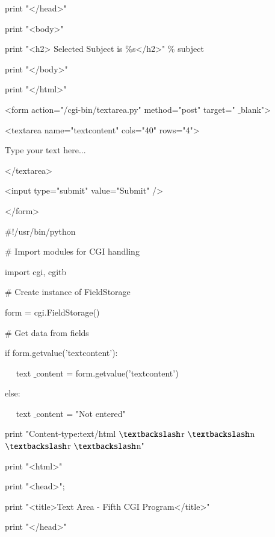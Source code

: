\documentclass[a4paper,12pt]{report}
\begin{document}
\noindent 
print "</head>" \par
\noindent 
print "<body>" \par
\noindent 
print "<h2> Selected Subject is  $  \%  $s</h2>"  $  \%  $ subject \par
\noindent 
print "</body>" \par
\noindent 
print "</html>" \par
\vspace{12pt}
\noindent 
<form action="/cgi-bin/textarea.py" method="post" target=" $  \_  $blank"> \par
\noindent 
<textarea name="textcontent" cols="40" rows="4"> \par
\noindent 
Type your text here... \par
\noindent 
</textarea> \par
\noindent 
<input type="submit" value="Submit" /> \par
\noindent 
</form> \par
\vspace{12pt}
\noindent 
 $  \#  $!/usr/bin/python \par
\vspace{12pt}
\noindent 
 $  \#  $ Import modules for CGI handling  \par
\noindent 
import cgi, cgitb  \par
\vspace{12pt}
\noindent 
 $  \#  $ Create instance of FieldStorage  \par
\noindent 
form = cgi.FieldStorage()  \par
\vspace{12pt}
\noindent 
 $  \#  $ Get data from fields \par
\noindent 
if form.getvalue('textcontent'): \par
\noindent 
~~ text $  \_  $content = form.getvalue('textcontent') \par
\noindent 
else: \par
\noindent 
~~ text $  \_  $content = "Not entered" \par
\vspace{12pt}
\noindent 
print "Content-type:text/html $  \textbackslash  $r $  \textbackslash  $n $  \textbackslash  $r $  \textbackslash  $n" \par
\noindent 
print "<html>" \par
\noindent 
print "<head>"; \par
\noindent 
print "<title>Text Area - Fifth CGI Program</title>" \par
\noindent 
print "</head>" \par
\end{document}
